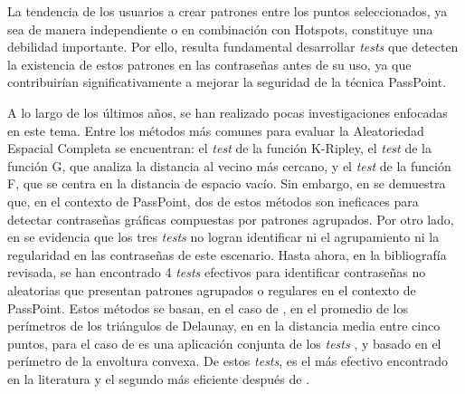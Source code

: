 \documentclass[12pt]{report}
\begin{document}
	
	La tendencia de los usuarios a crear patrones entre los puntos seleccionados, ya sea de manera independiente o en combinación con Hotspots, constituye una debilidad importante. Por ello, resulta fundamental desarrollar \textit{tests} que detecten la existencia de estos patrones en las contraseñas antes de su uso, ya que contribuirían significativamente a mejorar la seguridad de la técnica PassPoint.
	
	

	A lo largo de los últimos años, se han realizado pocas investigaciones enfocadas en este tema. Entre los métodos más comunes para evaluar la Aleatoriedad Espacial Completa se encuentran: el \textit{test} de la función K-Ripley, el \textit{test} de la función G, que analiza la distancia al vecino más cercano, y el \textit{test} de la función F, que se centra en la distancia de espacio vacío. Sin embargo, en \cite{6,7} se demuestra que, en el contexto de PassPoint, dos de estos métodos son ineficaces para detectar contraseñas gráficas compuestas por patrones agrupados. Por otro lado, en \cite{7,8} se evidencia que los tres \textit{tests} no logran identificar ni el agrupamiento ni la regularidad en las contraseñas de este escenario. Hasta ahora, en la bibliografía revisada, se han encontrado 4 \textit{tests} efectivos \cite{7,9,10,11} para identificar contraseñas no aleatorias que presentan patrones agrupados o regulares en el contexto de PassPoint. Estos métodos se basan, en el caso de \cite{9}, en el promedio de los perímetros de los triángulos de Delaunay, en  \cite{7} en la distancia media entre cinco puntos, para el caso de \cite{10} es una aplicación conjunta de los \textit{tests} \cite{7,9}, y \cite{11} basado en  el perímetro de la envoltura convexa. De estos \textit{tests}, \cite{11} es el más efectivo encontrado en la literatura y el segundo más eficiente después de \cite{7}.
	
\end{document}
